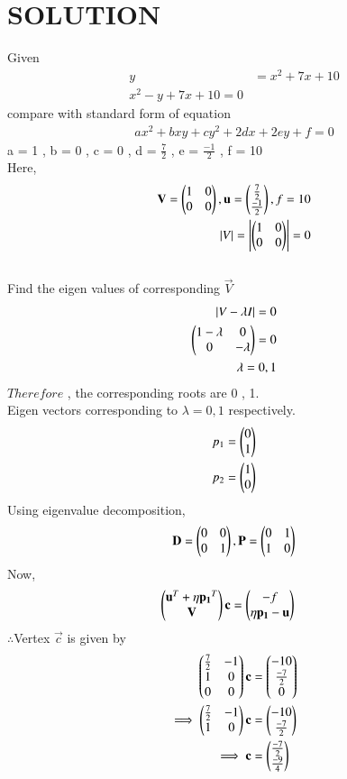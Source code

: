 \documentclass[journal,12pt,twocolumn]{IEEEtran}
\begin{document}
\section{SOLUTION}  
Given
\begin{align}
y& = x^2+7x+10
\\
x^2-y+7x+10 = 0
\end{align}
compare with standard form of equation
\begin{align}
a{x}^2+b{x}{y}+c{y}^2+2d{x}+2e{y}+f = 0
\end{align}
a = 1 , b = 0 , c = 0 , d = $\frac{7}{2}$ , e = $\frac{-1}{2}$ , f = 10
\\
Here,
\begin{align}
\mathbf{V} = \begin{pmatrix}1 & 0 \\ 0 & 0\end{pmatrix},\mathbf{u}=\begin{pmatrix}\frac{7}{2}\\ \frac{-1}{2}\end{pmatrix},f = 10
\\
\left\vert V\right\vert = \left\vert\begin{pmatrix}1 & 0 \\ 0 & 0\end{pmatrix}\right\vert = 0
\end{align}
\\
Find the eigen values of corresponding $\vec{V}$
\begin{align}
\left\vert V-\lambda{I}\right\vert = 0
\\
\begin{pmatrix}1-\lambda & 0 \\ 0 & -\lambda\end{pmatrix} = 0
\\
\lambda = 0 , 1
\end{align}
$Therefore$ , the corresponding roots are 0 , 1.
\\
Eigen vectors corresponding to $\lambda = 0 , 1$ respectively.
\begin{align}
p_1 = \begin{pmatrix}0 \\ 1\end{pmatrix}
\\
p_2 = \begin{pmatrix}1 \\ 0\end{pmatrix}
\end{align}
Using eigenvalue decomposition,
\begin{align}
\mathbf{D} = \begin{pmatrix}0 & 0\\0 & 1\end{pmatrix} ,\mathbf{P}=\begin{pmatrix}0 & 1\\1 & 0\end{pmatrix}
\end{align}
Now,
\begin{align}
\begin{pmatrix}\mathbf{u}^T + \eta\mathbf{p_1}^T \\ \mathbf{V}\end{pmatrix}\mathbf{c} &= \begin{pmatrix}-f \\ \eta\mathbf{p_1}-\mathbf{u}\end{pmatrix} 
\end{align}
$\therefore$Vertex $\vec{c}$ is given by
\begin{align}
\begin{pmatrix}\frac{7}{2} & -1 \\ 1 & 0 \\ 0 & 0\end{pmatrix}\mathbf{c} &= \begin{pmatrix}-10 \\ \frac{-7}{2} \\ 0\end{pmatrix} \\
\implies  \begin{pmatrix}\frac{7}{2} & -1 \\ 1 & 0\end{pmatrix}\mathbf{c} &= \begin{pmatrix}-10 \\ \frac{-7}{2}\end{pmatrix}
\\
\implies \mathbf{c} &= \begin{pmatrix}\frac{-7}{2}\\\frac{-9}{4}\end{pmatrix}
\end{align}
\end{document}
